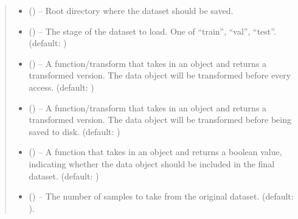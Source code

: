 \documentclass[letterpaper,10pt,english]{sphinxhowto}
\begin{document}
\begin{fulllineitems}
\begin{itemize}
\end{itemize}
\begin{quote}\begin{description}
\begin{itemize}
\item {} 
\sphinxAtStartPar
{} () – Root directory where the dataset should be saved.

\item {} 
\sphinxAtStartPar
{} () – The stage of the dataset to load. One of “train”, “val”, “test”. (default: )

\item {} 
\sphinxAtStartPar
{} (\sphinxstyleliteralemphasis{\sphinxupquote{, }}) – A function/transform that takes in an  object and returns a transformed version. The data object will be transformed before every access. (default: )

\item {} 
\sphinxAtStartPar
{} (\sphinxstyleliteralemphasis{\sphinxupquote{, }}) – A function/transform that takes in an  object and returns a transformed version. The data object will be transformed before being saved to disk. (default: )

\item {} 
\sphinxAtStartPar
{} (\sphinxstyleliteralemphasis{\sphinxupquote{, }}) – A function that takes in an  object and returns a boolean value, indicating whether the data object should be included in the final dataset. (default: )

\item {} 
\sphinxAtStartPar
{} () – The number of samples to take from the original dataset. (default: ).


\end{itemize}
\end{description}
\end{quote}
\end{fulllineitems}
\end{document}
